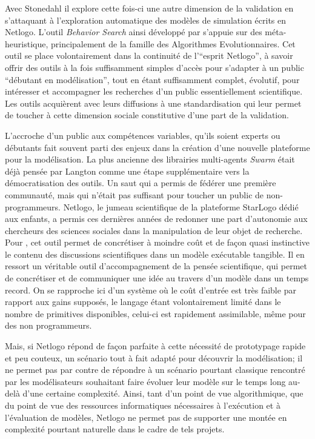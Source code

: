 Avec Stonedahl \autocites{Stonedahl2011, Stonedahl2011b, Stonedahl2010} il explore cette fois-ci une autre dimension de la validation en s'attaquant à l'exploration automatique des modèles de simulation écrits en Netlogo. L'outil \textit{Behavior Search} ainsi développé par \textcite{Stonedahl2011a} s'appuie sur des méta-heuristique, principalement de la famille des Algorithmes Evolutionnaires. Cet outil se place volontairement dans la continuité de l'\enquote{esprit Netlogo}, à savoir offrir des outils à la fois suffisamment simples d'accès pour s'adapter à un public \enquote{débutant en modélisation}, tout en étant suffisamment complet, évolutif, pour intéresser et accompagner les recherches d'un public essentiellement scientifique. Les outils acquièrent avec leurs diffusions à une standardisation qui leur permet de toucher à cette dimension sociale constitutive d'une part de la validation.

L'accroche d'un public aux compétences variables, qu'ils soient experts ou débutants fait souvent parti des enjeux dans la création d'une nouvelle plateforme pour la modélisation. La plus ancienne des librairies multi-agents \textit{Swarm} était déjà pensée par Langton comme une étape supplémentaire vers la démocratisation des outils. Un saut qui a permis de fédérer une première communauté, mais qui n'était pas suffisant pour toucher un public de non-programmeurs. Netlogo, le jumeau scientifique de la plateforme StarLogo dédié aux enfants, a permis ces dernières années de redonner une part d'autonomie aux chercheurs des sciences sociales dans la manipulation de leur objet de recherche. Pour \textcite{Banos2013}, cet outil permet de concrétiser à moindre coût et de façon quasi instinctive le contenu des discussions scientifiques dans un modèle exécutable tangible. Il en ressort un véritable outil d'accompagnement de la pensée scientifique, qui permet de concrétiser et de communiquer une idée au travers d'un modèle dans un temps record. On se rapproche ici d'un système où le coût d'entrée est très faible par rapport aux gains supposés, le langage étant volontairement limité dans le nombre de primitives disponibles, celui-ci est rapidement assimilable, même pour des non programmeurs. 

Mais, si Netlogo répond de façon parfaite à cette nécessité de prototypage rapide et peu couteux, un scénario tout à fait adapté pour découvrir la modélisation; il ne permet pas par contre de répondre à un scénario pourtant classique rencontré par les modélisateurs souhaitant faire évoluer leur modèle sur le temps long au-delà d'une certaine complexité. Ainsi, tant d'un point de vue algorithmique, que du point de vue des ressources informatiques nécessaires à l'exécution et à l'évaluation de modèles, Netlogo ne permet pas de supporter une montée en complexité pourtant naturelle dans le cadre de tels projets. 

